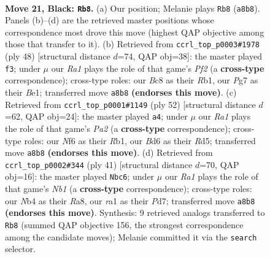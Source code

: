 \documentclass[11pt]{article}
\begin{document}
\clearpage

\begin{figure}[p]\centering
\begin{subfigure}{0.46\textwidth}\centering
\resizebox{\linewidth}{!}{%
\newchessgame
\chessboard[
  setfen={r1b4k/pp4pp/3b1n2/P4p2/1nB2P2/1P2P1P1/8/RNB2RK1 b - - 2 21},
  showmover=false,
  pgfstyle=straightmove, color=movearrow, markmove={a8-b8}
]}
\caption{}
\end{subfigure}\hfill
\begin{subfigure}{0.46\textwidth}\centering
\resizebox{\linewidth}{!}{%
\newchessgame
\chessboard[
  setfen={r3r3/pn4p1/1p2kb1p/2p1p3/P1N3P1/4P3/1PR2P1P/1R2BK2 w - - 6 25},
  showmover=false,
  pgfstyle=straightmove, color=movearrow, markmove={f2-f3}
]}
\caption{}
\end{subfigure}
\\[4pt]
\begin{subfigure}{0.46\textwidth}\centering
\resizebox{\linewidth}{!}{%
\newchessgame
\chessboard[
  setfen={r1b1r3/p1B1p2k/5b1p/2NR1p2/6p1/4P3/P4PPP/1R4K1 w - - 0 27},
  showmover=false,
  pgfstyle=straightmove, color=movearrow, markmove={a2-a4}
]}
\caption{}
\end{subfigure}\hfill
\begin{subfigure}{0.46\textwidth}\centering
\resizebox{\linewidth}{!}{%
\newchessgame
\chessboard[
  setfen={rn4k1/p2p2bp/5pp1/N2bn3/1p6/4B2P/1P2NPP1/R4RK1 b - - 1 21},
  showmover=false,
  pgfstyle=straightmove, color=movearrow, markmove={b8-c6}
]}
\caption{}
\end{subfigure}
\caption{\textbf{Move 21, Black: \texttt{Rb8}.} (a) Our position; Melanie plays \texttt{Rb8} (\texttt{a8b8}). Panels (b)--(d) are the retrieved master positions whose correspondence most drove this move (highest QAP objective among those that transfer to it). (b) Retrieved from \texttt{ccrl\_top\_p0003\#1978} (ply 48) [structural distance $d$=74, QAP obj=38]: the master played \texttt{f3}; under $\mu$ our \emph{Ra1} plays the role of that game's \emph{Pf2} (a \textbf{cross-type} correspondence); cross-type roles: our \emph{B}c8 as their \emph{R}b1, our \emph{P}g7 as their \emph{B}e1; transferred move \texttt{a8b8} \textbf{(endorses this move)}. (c) Retrieved from \texttt{ccrl\_top\_p0001\#1149} (ply 52) [structural distance $d$=62, QAP obj=24]: the master played \texttt{a4}; under $\mu$ our \emph{Ra1} plays the role of that game's \emph{Pa2} (a \textbf{cross-type} correspondence); cross-type roles: our \emph{N}f6 as their \emph{R}b1, our \emph{B}d6 as their \emph{R}d5; transferred move \texttt{a8b8} \textbf{(endorses this move)}. (d) Retrieved from \texttt{ccrl\_top\_p0002\#344} (ply 41) [structural distance $d$=70, QAP obj=16]: the master played \texttt{Nbc6}; under $\mu$ our \emph{Ra1} plays the role of that game's \emph{Nb1} (a \textbf{cross-type} correspondence); cross-type roles: our \emph{N}b4 as their \emph{R}a8, our \emph{r}a1 as their \emph{P}d7; transferred move \texttt{a8b8} \textbf{(endorses this move)}. Synthesis: 9 retrieved analogs transferred to \texttt{Rb8} (summed QAP objective 156, the strongest correspondence among the candidate moves); Melanie committed it via the \texttt{search} selector.}
\label{fig:thought-m41}
\end{figure}
\end{document}

